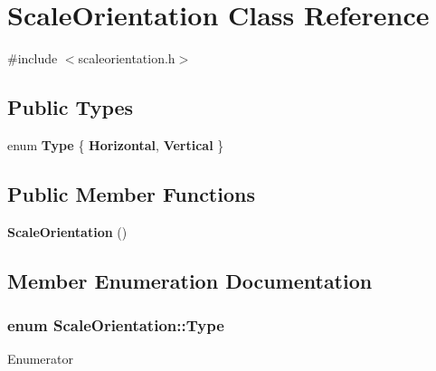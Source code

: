 \section{Scale\+Orientation Class Reference}
\label{classScaleOrientation}


{\ttfamily \#include $<$scaleorientation.\+h$>$}

\subsection*{Public Types}
\begin{DoxyCompactItemize}
\item 
enum {\bf Type} \{ {\bf Horizontal}, 
{\bf Vertical}
 \}
\end{DoxyCompactItemize}
\subsection*{Public Member Functions}
\begin{DoxyCompactItemize}
\item 
{\bf Scale\+Orientation} ()
\end{DoxyCompactItemize}


\subsection{Member Enumeration Documentation}
\subsubsection[{Type}]{\setlength{\rightskip}{0pt plus 5cm}enum {\bf Scale\+Orientation\+::\+Type}}\label{classScaleOrientation_ab2e6018dec7d4370858eb54cdebb194f}
\begin{Desc}
\item[Enumerator]\par
\begin{description}
\item[{\em 
Horizontal\label{classScaleOrientation_ab2e6018dec7d4370858eb54cdebb194fad0897577b50e213080fa8bde7afd7eb7}
}]\item[{\em 
Vertical\label{classScaleOrientation_ab2e6018dec7d4370858eb54cdebb194fa5129837d7b7c32b1e855df1575e02ba2}
}]\end{description}
\end{Desc}



